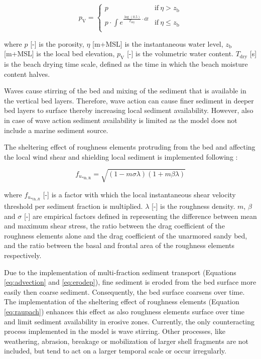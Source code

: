 \begin{equation}
  \label{eq:drying}
  p_{\mathrm{V}} = \left\{
    \begin{array}{ll}
      p & \mathrm{if} ~ \eta > z_{\mathrm{b}} \\
      p \cdot \int e^{\frac{\log \left( 0.5 \right)}{T_{\mathrm{dry}}} \cdot \mathrm{d} t} & \mathrm{if} ~ \eta \leq z_{\mathrm{b}} \\
    \end{array}
  \right.
\end{equation}

\noindent where $p$ [-] is the porosity, $\eta$ [m+MSL] is the
instantaneous water level, $z_{\mathrm{b}}$ [m+MSL] is the local bed
elevation, $p_{\mathrm{V}}$ [-] is the volumetric water
content. $T_{\mathrm{dry}}$ [s] is the beach drying time scale,
defined as the time in which the beach moisture content halves.

Waves cause stirring of the bed and mixing of the sediment that is
available in the vertical bed layers. Therefore, wave action can cause
finer sediment in deeper bed layers to surface thereby increasing
local sediment availability. However, also in case of wave action
sediment availability is limited as the model does not include a
marine sediment source.

The sheltering effect of roughness elements protruding from the bed
and affecting the local wind shear and shielding local sediment is
implemented following \citet{Raupach1993}:

\begin{equation}
  \label{eq:raupach}
  f_{u_{\mathrm{* th, R}}} = \sqrt{ \left( 1 - m \sigma \lambda \right) \left( 1 + m \beta \lambda \right) }
\end{equation}

\noindent where $f_{u_{\mathrm{* th},R}}$ [-] is a factor with which
the local instantaneous shear velocity threshold per sediment fraction
is multiplied. $\lambda$ [-] is the roughness density. $m$, $\beta$
and $\sigma$ [-] are empirical factors defined in \citet{Raupach1993}
representing the difference between mean and maximum shear stress, the
ratio between the drag coefficient of the roughness elements alone and
the drag coefficient of the unarmored sandy bed, and the ratio between
the basal and frontal area of the roughness elements respectively.

Due to the implementation of multi-fraction sediment transport
(Equations \ref{eq:advection} and \ref{eq:erodep}), fine sediment is
eroded from the bed surface more easily then coarse
sediment. Consequently, the bed surface coarsens over time. The
implementation of the sheltering effect of roughness elements
(Equation \ref{eq:raupach}) enhances this effect as also roughness
elements surface over time and limit sediment availability in erosive
zones. Currently, the only counteracting process implemented in the
model is wave stirring. Other processes, like weathering, abrasion,
breakage or mobilization of larger shell fragments are not included,
but tend to act on a larger temporal scale or occur irregularly.

